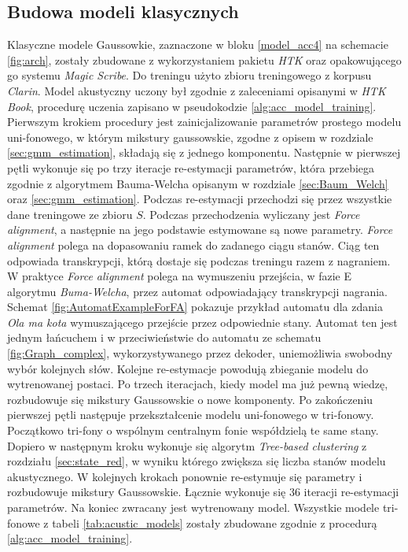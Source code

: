 \documentclass[11pt]{article}
\newcommand{\refBlock}[1]{
	\hyperref[#1]{\ref*{#1}}
}
\begin{document}
	\subsection{Budowa modeli klasycznych}
		Klasyczne modele Gaussowkie, zaznaczone w bloku \refBlock{model_acc4} na schemacie \ref{fig:arch}, zostały zbudowane z wykorzystaniem pakietu \textit{HTK} oraz opakowującego go systemu \textit{Magic Scribe}. Do treningu użyto zbioru treningowego z korpusu \textit{Clarin}. Model akustyczny uczony był zgodnie z zaleceniami opisanymi w \textit{HTK Book}\cite{htkbook}, procedurę uczenia zapisano w pseudokodzie \ref{alg:acc_model_training}. Pierwszym krokiem procedury jest zainicjalizowanie parametrów prostego modelu uni-fonowego, w którym mikstury gaussowskie, zgodne z opisem w rozdziale \ref{sec:gmm_estimation}, składają się z jednego komponentu. Następnie w pierwszej pętli wykonuje się po trzy iteracje re-estymacji parametrów, która przebiega zgodnie z algorytmem Bauma-Welcha opisanym w rozdziale \ref{sec:Baum_Welch} oraz \ref{sec:gmm_estimation}. Podczas re-estymacji przechodzi się przez wszystkie dane treningowe ze zbioru $S$. Podczas przechodzenia wyliczany jest \textit{Force alignment}, a następnie na jego podstawie estymowane są nowe parametry. \textit{Force alignment} polega na dopasowaniu ramek do zadanego ciągu stanów. Ciąg ten odpowiada transkrypcji, którą dostaje się podczas treningu razem z nagraniem. W praktyce \textit{Force alignment} polega na wymuszeniu przejścia, w fazie E algorytmu \textit{Buma-Welcha}, przez automat odpowiadający transkrypcji nagrania. Schemat \ref{fig:AutomatExampleForFA} pokazuje przykład automatu dla zdania \textit{Ola ma kota} wymuszającego przejście przez odpowiednie stany. Automat ten jest jednym łańcuchem i w przeciwieństwie do automatu ze schematu \ref{fig:Graph_complex}, wykorzystywanego przez dekoder, uniemożliwia swobodny wybór kolejnych słów. Kolejne re-estymacje powodują zbieganie modelu do wytrenowanej postaci. Po trzech iteracjach, kiedy model ma już pewną wiedzę, rozbudowuje się mikstury Gaussowskie o nowe komponenty. Po zakończeniu pierwszej pętli następuje przekształcenie modelu uni-fonowego w tri-fonowy. Początkowo tri-fony o wspólnym centralnym fonie współdzielą te same stany. Dopiero w następnym kroku wykonuje się algorytm \textit{Tree-based clustering} z rozdziału \ref{sec:state_red}, w wyniku którego zwiększa się liczba stanów modelu akustycznego. W kolejnych krokach ponownie re-estymuje się parametry i rozbudowuje mikstury Gaussowskie. Łącznie wykonuje się $36$ iteracji re-estymacji parametrów. Na koniec zwracany jest wytrenowany model. Wszystkie modele tri-fonowe z tabeli \ref{tab:acustic_models} zostały zbudowane zgodnie z procedurą \ref{alg:acc_model_training}.
		
\end{document}
